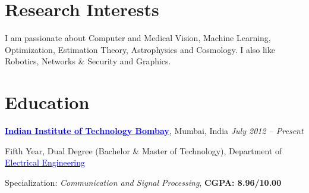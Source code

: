 \documentclass[margin,line]{res}
\newenvironment{list1}{
  \begin{list}{\ding{113}}{%
      \setlength{\itemsep}{0in}
      \setlength{\parsep}{0in} \setlength{\parskip}{0in}
      \setlength{\topsep}{0in} \setlength{\partopsep}{0in} 
      \setlength{\leftmargin}{0.17in}}}{\end{list}}
\begin{document}

\begin{resume}


\section{\sc Research Interests}
I am passionate about Computer and Medical Vision, Machine Learning, Optimization, Estimation Theory, Astrophysics and Cosmology. I also like Robotics, Networks \& Security and Graphics.

\vspace*{-0.13in}

\section{\sc Education}
{\bf \href{http://www.iitb.ac.in/}{\textcolor{blue}{Indian Institute of Technology Bombay}}}, Mumbai, India \hfill {\it July 2012 -- Present} \\
\vspace*{-.1in}
\begin{list1}
\item[] Fifth Year, Dual Degree (Bachelor \& Master of Technology), Department of \href{http://www.ee.iitb.ac.in/}{\textcolor{blue}{Electrical Engineering}}
\item[] Specialization: {\em Communication and Signal Processing}, {\bf CGPA: 8.96/10.00}
\end{list1}


\end{resume}
\end{document}
